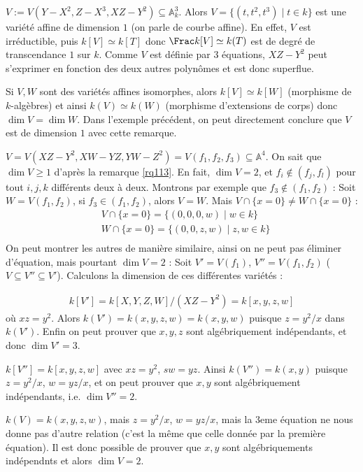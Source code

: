             \begin{expl}
                $V := V(Y - X^2, Z - X^3, XZ - Y^2) \subseteq \mathbb{A}^3_k$. Alors $V = \{(t,t^2, t^3) \mid t \in k\}$ est une variété affine de dimension $1$ (on parle de courbe affine). En effet, $V$ est irréductible, puis $k[V] \simeq k[T]$ donc $\Frac k[V] \simeq k(T)$ est de degré de transcendance $1$ sur $k$. Comme $V$ est définie par $3$ équations, $XZ - Y^2$ peut s'exprimer en fonction des deux autres polynômes et est donc superflue.
            \end{expl}
            \begin{remq}
                Si $V,W$ sont des variétés affines isomorphes, alors $k[V] \simeq k[W]$ (morphisme de $k$-algèbres) et ainsi $k(V) \simeq k(W)$ (morphisme d'extensions de corps) donc $\dim V = \dim W$. Dans l'exemple précédent, on peut directement conclure que $V$ est de dimension $1$ avec cette remarque.
            \end{remq}
            \begin{expl}
                $V = V(XZ - Y^2 ,  XW - YZ, YW - Z^2) = V(f_1, f_2, f_3) \subseteq \mathbb{A}^4$. On sait que $\dim V \geq 1$ d'après la remarque \ref{rq113}. En fait, $\dim V = 2$, et $f_i \notin (f_j, f_l)$ pour tout $i,j,k$ différents deux à deux. Montrons par exemple que $f_3 \notin (f_1, f_2)$ : Soit $W = V(f_1, f_2)$, si $f_3 \in (f_1, f_2)$, alors $V = W$. Mais $V \cap \{x = 0\} \neq W \cap \{x = 0\}$ :
                \begin{align*}
                    &V \cap \{x = 0\} = \{(0,0,0,w) \mid w \in k\} \\
                    &W \cap \{x = 0\} = \{(0,0,z,w) \mid z,w \in k\} \\
                \end{align*}
                On peut montrer les autres de manière similaire, ainsi on ne peut pas éliminer d'équation, mais pourtant $\dim V = 2$ : Soit $V' = V(f_1)$, $V'' = V(f_1, f_2)$ ($V \subseteq V'' \subseteq V'$). Calculons la dimension de ces différentes variétés :
                \item 
                \begin{align*}
                    k[V'] = k[X,Y,Z,W]/(XZ - Y^2) = k[x,y,z,w]
                \end{align*}
                où $xz = y^2$. Alors $k(V') = k(x,y,z,w) = k(x,y,w)$ puisque $z = y^2/x$ dans $k(V')$. Enfin on peut prouver que $x,y,z$ sont algébriquement indépendants, et donc $\dim V' = 3$. 
                \item $k[V''] = k[x,y,z,w]$ avec $xz = y^2$, $sw = yz$. Ainsi $k(V'') = k(x,y)$ puisque $z = y^2/x$, $w = yz/x$, et on peut prouver que $x,y$ sont algébriquement indépendants, i.e. $\dim V'' = 2$. 
                \item $k(V) = k(x,y,z,w)$, mais $z = y^2/x$, $w = yz/x$, mais la $3$eme équation ne nous donne pas d'autre relation (c'est la même que celle donnée par la première équation). Il est donc possible de prouver que $x,y$ sont algébriquements indépendnts et alors $\dim V = 2$.
            \end{expl}
            \cleardoublepage

